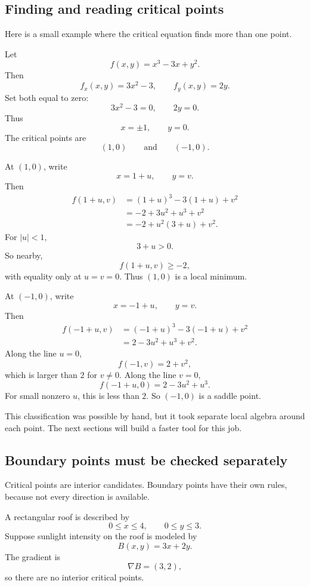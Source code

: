 \subsection{Finding and reading critical points}

Here is a small example where the critical equation finds more than one point.

Let
\[
    f(x,y)=x^3-3x+y^2.
\]
Then
\[
    f_x(x,y)=3x^2-3,
    \qquad
    f_y(x,y)=2y.
\]
Set both equal to zero:
\[
    3x^2-3=0,
    \qquad
    2y=0.
\]
Thus
\[
    x=\pm1,
    \qquad
    y=0.
\]
The critical points are
\[
    (1,0)
    \qquad\text{and}\qquad
    (-1,0).
\]

At \((1,0)\), write
\[
    x=1+u,\qquad y=v.
\]
Then
\[
\begin{aligned}
f(1+u,v)
&=(1+u)^3-3(1+u)+v^2\\
&=-2+3u^2+u^3+v^2\\
&=-2+u^2(3+u)+v^2.
\end{aligned}
\]
For \(|u|<1\),
\[
    3+u>0.
\]
So nearby,
\[
    f(1+u,v)\ge -2,
\]
with equality only at \(u=v=0\).  Thus \((1,0)\) is a local minimum.

At \((-1,0)\), write
\[
    x=-1+u,\qquad y=v.
\]
Then
\[
\begin{aligned}
f(-1+u,v)
&=(-1+u)^3-3(-1+u)+v^2\\
&=2-3u^2+u^3+v^2.
\end{aligned}
\]
Along the line \(u=0\),
\[
    f(-1,v)=2+v^2,
\]
which is larger than \(2\) for \(v\ne0\).  Along the line \(v=0\),
\[
    f(-1+u,0)=2-3u^2+u^3.
\]
For small nonzero \(u\), this is less than \(2\).  So \((-1,0)\) is a saddle point.

This classification was possible by hand, but it took separate local algebra around each
point.  The next sections will build a faster tool for this job.

\subsection{Boundary points must be checked separately}

Critical points are interior candidates.  Boundary points have their own rules, because
not every direction is available.

A rectangular roof is described by
\[
    0\le x\le 4,
    \qquad
    0\le y\le 3.
\]
Suppose sunlight intensity on the roof is modeled by
\[
    B(x,y)=3x+2y.
\]
The gradient is
\[
    \nabla B=(3,2),
\]
so there are no interior critical points.

